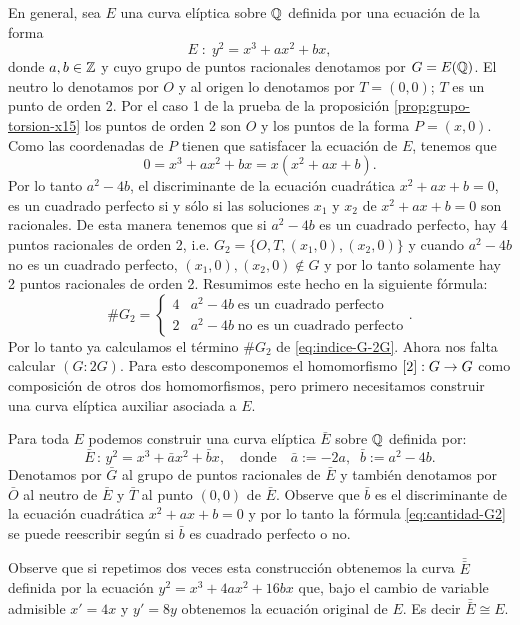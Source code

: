 En general, sea $E$ una curva elíptica sobre $\mathbb{Q}$ definida por una ecuación de la forma
\[
	E\; :\; y^2=x^3+ax^2+bx,
\]
donde $a,b\in\mathbb{Z}$ y cuyo grupo de puntos racionales denotamos por $G=E(\mathbb{Q})$. El neutro lo denotamos por $O$ y al origen lo denotamos por $T=(0,0)$; $T$ es un punto de orden 2. Por el caso 1 de la prueba de la proposición \ref{prop:grupo-torsion-x15} los puntos de orden 2 son $O$ y los puntos de la forma $P=(x,0)$. Como las coordenadas de $P$ tienen que satisfacer la ecuación de $E$, tenemos que
\[
	0=x^3+ax^2+bx=x(x^2+ax+b).
\]
Por lo tanto $a^2-4b$, el discriminante de la ecuación cuadrática $x^2+ax+b=0$, es un cuadrado perfecto si y sólo si las soluciones $x_1$ y $x_2$ de $x^2+ax+b=0$ son racionales. De esta manera tenemos que si $a^2-4b$ es un cuadrado perfecto, hay 4 puntos racionales de orden 2, i.e. $G_2=\{O,T,(x_1,0),(x_2,0)\}$ y cuando $a^2-4b$ no es un cuadrado perfecto, $(x_1,0),(x_2,0)\not\in G$ y por lo tanto solamente hay 2 puntos racionales de orden 2. Resumimos este hecho en la siguiente fórmula:
\begin{equation}\label{eq:cantidad-G2}
	\# G_2=	\begin{cases}
		4 & a^2-4b\;\text{es un cuadrado perfecto}\\
		2 & a^2-4b\;\text{no es un cuadrado perfecto}
	\end{cases}.
\end{equation}
Por lo tanto ya calculamos el término $\# G_2$ de \eqref{eq:indice-G-2G}. Ahora nos falta calcular $(G:2G)$. Para esto descomponemos el homomorfismo $[2]:G\rightarrow G$ como composición de otros dos homomorfismos, pero primero necesitamos construir una curva elíptica auxiliar asociada a $E$.

Para toda $E$ podemos construir una curva elíptica $\bar{E}$ sobre $\mathbb{Q}$ definida por:
\[
	\bar{E}\,:\, y^2=x^3+\bar{a}x^2+\bar{b}x,\quad\text{donde}\quad \bar{a}:=-2a,\;\;\bar{b}:=a^2-4b.
\]
Denotamos por $\bar{G}$ al grupo de puntos racionales de $\bar{E}$ y también denotamos por $\bar{O}$ al neutro de $\bar{E}$ y $\bar{T}$ al punto $(0,0)$ de $\bar{E}$. Observe que $\bar{b}$ es el discriminante de la ecuación cuadrática $x^2+ax+b=0$ y por lo tanto la fórmula \eqref{eq:cantidad-G2} se puede reescribir según si $\bar{b}$ es cuadrado perfecto o no.

Observe que si repetimos dos veces esta construcción obtenemos la curva $\bar{\bar{E}}$ definida por la ecuación $y^2=x^3+4ax^2+16bx$ que, bajo el cambio de variable admisible $x'=4x$ y $y'=8y$ obtenemos la ecuación original de $E$. Es decir $\bar{\bar{E}}\cong E$. 

